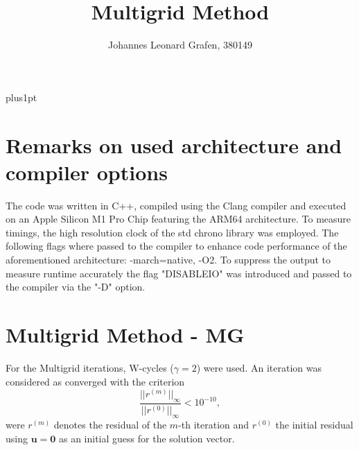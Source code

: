 \documentclass[11pt,a4paper]{article}
\title{Multigrid Method}
\author{Johannes Leonard Grafen, 380149}
\begin{document}
\renewcommand\baselinestretch{1.0}
\baselineskip=18pt plus1pt	

\maketitle
\newpage
{}
\tableofcontents
\listoffigures	%
\newpage

\section{Remarks on used architecture and compiler options}
The code was written in C++, compiled using the Clang compiler and executed on an Apple Silicon M1 Pro Chip featuring the ARM64 architecture. To measure timings, the high resolution clock of the std chrono library was employed. The following flags where passed to the compiler to enhance code performance of the aforementioned architecture: -march=native, -O2. To suppress the output to measure runtime accurately the flag "DISABLEIO" was introduced and passed to the compiler via the "-D" option.

\section{Multigrid Method - MG}
\label{chapter:MG}
For the Multigrid iterations, W-cycles ($\gamma = 2$) were used. An iteration was considered as converged with the criterion 
\begin{equation}
	\frac{|| r^{(m)}||_{\infty}}{|| r^{(0)}||_{\infty}} < 10^{-10} ,
	\label{eq::measure}
\end{equation}
were $r^{(m)}$ denotes the residual of the $m$-th iteration and $r^{(0)}$ the initial residual using $\mathbf{u} = \mathbf{0}$ as an initial guess for the solution vector.
\end{document}
